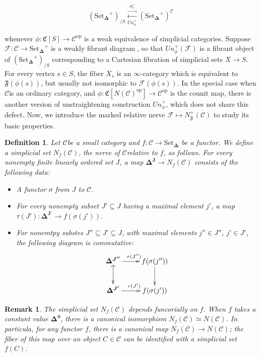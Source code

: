 \documentclass[12pt]{amsart}
\newcommand{\8}{\ensuremath{\infty}}
\newcommand{\C}{\ensuremath{\mathscr{C}}}
\newcommand{\Simplex}[1][n]{\ensuremath{\boldsymbol{\Delta^{#1}}}}
\newcommand{\SSet}{\ensuremath{\text{Set}_{\boldsymbol{\Delta}}}}
\newcommand{\op}[1]{\ensuremath{{#1}^{\text{op}}}}
\newcommand{\adj}[2]{\ensuremath{\overset{\overset{#1}{ \rightarrow}}{\underset{#2}{\leftarrow}}}}
\newtheorem{definition}{Definition}
\newtheorem{remark}{Remark}
\begin{document}
$$
  (\SSet^+)_{/S} \adj{St^+_\phi}{Un^+_\phi} (\SSet^+)^\C
$$

whenever $\phi: \mathfrak{C}[S] \rightarrow \op\C$ is a weak equivalence of simplicial categories. Suppose $\mathcal{F} : \C \rightarrow \SSet^{+}$ is a weakly fibrant diagram , so that $Un_\phi^+(\mathcal{F})$ is a fibrant object of $(\SSet^+)_{/S}$ corresponding to a Cartesian fibration of simplicial sets $X \rightarrow S$. For every vertex $s \in S$, the fiber $X_s$ is an \8-category which is equivalent to $\mathfrak{F}(\phi(s))$, but usually not isomorphic to $\mathcal{F}(\phi(s))$. In the special case when \C is an ordinary category, and $\phi: \mathfrak{C}[\op{N(\C)}] \rightarrow \op\C$ is the counit map, there is another version of unstraightening construction $Un_\phi^+$, which does not share this defect. Now, we introduce the marked relative nerve $\mathcal{F} \mapsto N_\mathfrak{F}^+(\C)$ to study its basic properties.

\begin{definition}
  Let \C be a small category and $f : \C \rightarrow \SSet$ be a functor. We define a simplicial set $N_f(\C)$, the nerve of \C relative to $f$, as follows. For every nonempty finite linearly ordered set $J$, a map $\Simplex[J] \rightarrow N_f(\C)$ consists of the following data:
  \begin{itemize}
    \item A functor $\sigma$ from $J$ to \C.
    \item For every nonempty subset $J' \subseteq J$ having a maximal element $j'$, a map $\tau(J') : \Simplex[J'] \rightarrow f(\sigma(j'))$.
    \item For nonemtpy substes $J'' \subseteq J' \subseteq J$, with maximal elements $j'' \in J''$, $j' \in J'$, the following diagram is commutative:
          $$
            \begin{xy}
              \xymatrix{
                \Simplex[J'']\ar[r]^{\tau(J'')}\ar@{(->}[d] & f(\sigma(j''))\ar[d] \\
                \Simplex[J']\ar[r]^{\tau(J')} & f(\sigma(j'))
              }
            \end{xy}
          $$
  \end{itemize}
\end{definition}

\begin{remark}
  The simplicial set $N_f(\C)$ depends funcorially on $f$. When $f$ takes a constant value \Simplex[0], there is a canonical isomorphism $N_f(\C) \simeq N(\C)$. In particula, for any functor $f$, there is a canonical map $N_f(\C) \rightarrow N(\C)$; the fiber of this map over an object $C \in \C$ can be identified with a simplicial set $f(C)$.
\end{remark}
\end{document}
